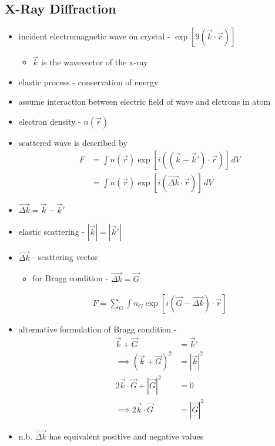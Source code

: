\documentclass[a4paper,11pt,normalem]{article}
\begin{document}
\section{}
\subsection{X-Ray Diffraction}

\begin{itemize}
    \item incident electromagnetic wave on crystal - \(\exp[9(\vec{k}\cdot \vec{r})]\)
        \begin{itemize}
            \item \(\vec{k}\) is the wavevector of the x-ray
        \end{itemize}
    \item elastic process - conservation of energy
    \item assume interaction between electric field of wave and elctrons in atom
    \item electron density - \(n(\vec{r})\)
    \item scattered wave is described by
        \begin{align*}
            F &= \int n(\vec{r})\exp\left[i((\vec{k}-\vec{k}')\cdot\vec{r})\right]\,dV \\
              &= \int n(\vec{r})\exp\left[i(\vec{\Delta k}\cdot \vec{r})\right]\,dV
        \end{align*}
    \item \(\vec{\Delta k} = \vec{k} - \vec{k}'\)
    \item elastic scattering - \(|\vec{k}| = |\vec{k}'|\)
    \item \(\vec{\Delta k}\) - scattering vector
        \begin{itemize}
            \item for Bragg condition - \(\vec{\Delta k} = \vec{G}\)
        \end{itemize}
        \begin{align*}
            F = \sum_G \int n_G \exp\left[i(\vec{G} - \vec{\Delta k})\cdot\vec{r}\right]
        \end{align*}
    \item alternative formulation of Bragg condition -
        \begin{align*}
            \vec{k} + \vec{G} &= \vec{k}' \\
            \implies (\vec{k} + \vec{G})^2 &= |\vec{k}|^2 \\
            2\vec{k}\cdot\vec{G} + |\vec{G}|^2 &= 0 \\
            \implies 2\vec{k}\cdot\vec{G} &= |\vec{G}|^2
        \end{align*}
    \item n.b. \(\vec{\Delta k}\) has equivalent positive and negative values
\end{itemize}
\end{document}

